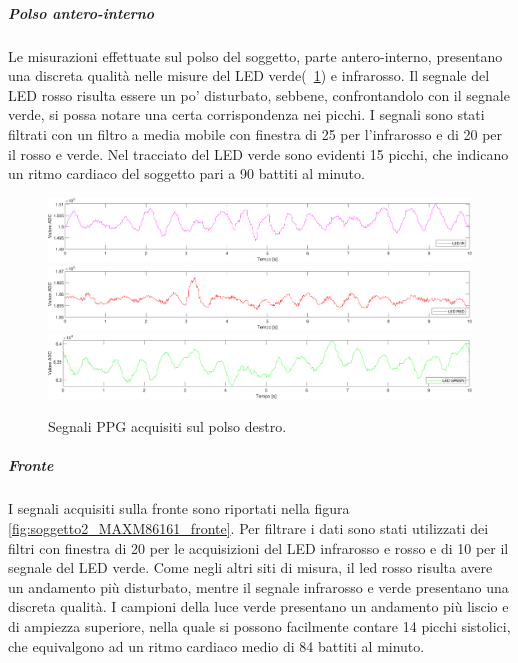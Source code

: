 \clearpage

\subparagraph{Polso antero-interno}

Le misurazioni effettuate sul polso del soggetto, parte antero-interno, presentano una discreta qualità nelle misure del LED verde(\Fig~\ref{fig:soggetto1_MAXM86161_polso}) e infrarosso. Il segnale del LED rosso risulta essere un po' disturbato, sebbene, confrontandolo con il segnale verde, si possa notare una certa corrispondenza nei picchi. I segnali sono stati filtrati con un filtro a media mobile con finestra di  25 per l'infrarosso e di 20 per il rosso e verde. Nel tracciato del LED verde sono evidenti 15 picchi, che indicano un ritmo cardiaco del soggetto pari a 90 battiti al minuto.

\begin{figure}[h]
	\centering
	\includegraphics[width=1\linewidth]{ImageFiles/Misure Preliminari/Soggetto 1/MAXM86161/polso_ired}
	\includegraphics[width=1\linewidth]{ImageFiles/Misure Preliminari/Soggetto 1/MAXM86161/polso_red}
	\includegraphics[width=1\linewidth]{ImageFiles/Misure Preliminari/Soggetto 1/MAXM86161/polso_green}
	\caption{Segnali PPG acquisiti sul polso destro.}
	\label{fig:soggetto1_MAXM86161_polso}
\end{figure}

\clearpage

\subparagraph{Fronte}

I segnali acquisiti sulla fronte sono riportati nella figura \ref{fig:soggetto2_MAXM86161_fronte}. Per filtrare i dati sono stati utilizzati dei filtri con finestra di 20 per le acquisizioni del LED infrarosso e rosso e di 10 per il segnale del LED verde. Come negli altri siti di misura, il led rosso risulta avere un andamento più disturbato, mentre il segnale infrarosso e verde presentano una discreta qualità. I campioni della luce verde presentano un andamento più liscio e di ampiezza superiore, nella quale si possono facilmente contare 14 picchi sistolici, che equivalgono ad un ritmo cardiaco medio di 84 battiti al minuto.

